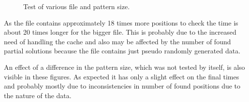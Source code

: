 \begin{figure}
\begin{minipage}{.5\linewidth}
\centering
{}
\end{minipage}%
\begin{minipage}{.5\linewidth}
\centering
{}
\end{minipage}\par\medskip

\caption{Test of various file and pattern size.}
\label{fig_sizeRes}
\end{figure}

As the file contains approximately 18 times more positions to check the time is about 20 times longer for the bigger file. This is probably due to the increased need of handling the cache and also may be affected by the number of found partial solutions because the file contains just pseudo randomly generated data.

An effect of a difference in the pattern size, which was not tested by itself, is also visible in these figures. As expected it has only a slight effect on the final times and probably mostly due to inconsistencies in number of found positions due to the nature of the data.

